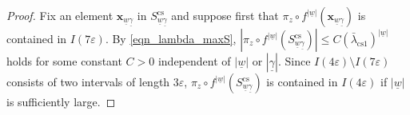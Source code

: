\documentclass{amsart}
\theoremstyle{definition}
\numberwithin{equation}{section}
\numberwithin{figure}{section}
\begin{document}
\begin{proof}
Fix an element $\boldsymbol{x}_{\underline{w}\underline{\gamma}}$ in $S_{\underline{w}\underline{\gamma}}^{\mathrm{cs}}$ and suppose first that 
$\pi_z\circ f^{|\underline{w}|}(\boldsymbol{x}_{\underline{w}\underline{\gamma}})$ is contained in $I(7\varepsilon)$.
By \eqref{eqn_lambda_maxS}, $|\pi_z\circ f^{|\underline{w}|}(S_{\underline{w}\underline{\gamma}}^{\mathrm{cs}})|\leq C(\bar\lambda_{\mathrm{cs} 1})^{|\underline{w}|}$ holds for some constant $C>0$ independent of $|\underline{w}|$ or $|\underline{\gamma}|$.
Since $I(4\varepsilon)\setminus I(7\varepsilon)$ 
consists of two intervals of length $3\varepsilon$, 
$\pi_z\circ f^{|\underline{w}|}(S_{\underline{w}\underline{\gamma}}^{\mathrm{cs}})$ is contained in $I(4\varepsilon)$ if 
$|\underline{w}|$ is sufficiently large.


\end{proof}
\end{document}
